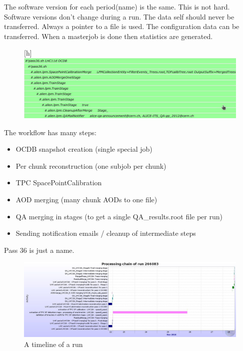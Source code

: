 The software version for each period(name) is the same. This is not hard. Software versions don't change during a run. The data self should never be transferred. Always a pointer to a file is used. The configuration data can be transferred. When a masterjob is done then statistics are generated. 

\begin{figure}
  \begin{center}[h]
    \includegraphics[scale=0.25]{./images/workflow.jpg}
    \caption{}
    \label{fig:}
  \end{center}
\end{figure}

The workflow has many steps:
\begin{itemize}
  \item OCDB snapshot creation (single special job)
  \item Per chunk reconstruction (one subjob per chunk)
  \item TPC SpacePointCalibration
  \item AOD merging (many chunk AODs to one file)
  \item QA merging in stages (to get a single QA\_results.root file per run)
  \item Sending notification emails / cleanup of intermediate steps
\end{itemize}

Pass 36 is just a name. 

\begin{figure}[h]
  \begin{center}
    \includegraphics[scale=0.25]{./images/timeline.png}
    \caption{A timeline of a run}
    \label{fig:timeline}
  \end{center}
\end{figure}

